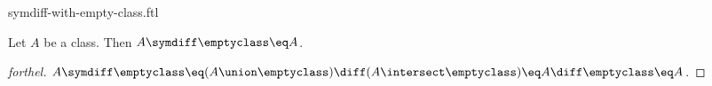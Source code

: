 \documentclass{stex}
\begin{document}
\begin{smodule}{symdiff-with-empty-class.ftl}


\begin{proposition}[forthel,id=SymdiffWithEmptyClassProp]
  Let $A$ be a class.
  Then $A \symdiff \emptyclass \eq A$.
\end{proposition}
\begin{proof}[forthel]
  $A \symdiff \emptyclass
    \eq (A \union \emptyclass) \diff (A \intersect \emptyclass)
    \eq A \diff \emptyclass
    \eq A$.
\end{proof}

\end{smodule}
\end{document}

